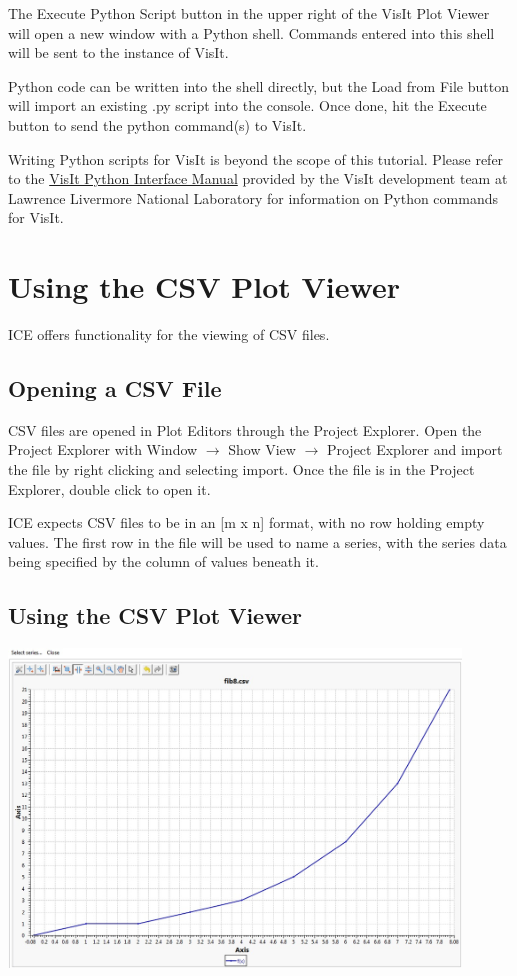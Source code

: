 The Execute Python Script button in the upper right of the VisIt Plot Viewer
will open a new window with a Python shell. Commands entered into this shell
will be sent to the instance of VisIt. 

Python code can be written into the shell directly, but the Load from File
button will import an existing .py script into the console. Once done, hit the
Execute button to send the python command(s) to VisIt.

Writing Python scripts for VisIt is beyond the scope of this tutorial. Please
refer to the
\href{https://wci.llnl.gov/simulation/computer-codes/visit/manuals}{VisIt Python
Interface Manual} provided by the VisIt development team at Lawrence Livermore
National Laboratory for information on Python commands for VisIt.

\section{Using the CSV Plot Viewer}

ICE offers functionality for the viewing of CSV files. 

\subsection{Opening a CSV File}

CSV files are opened in Plot Editors through the Project Explorer. Open the
Project Explorer with Window $\rightarrow$ Show View $\rightarrow$ Project
Explorer and import the file by right clicking and selecting import. Once the
file is in the Project Explorer, double click to open it.

ICE expects CSV files to be in an [m x n] format, with no row holding empty
values. The first row in the file will be used to name a series, with the series
data being specified by the column of values beneath it.

\subsection{Using the CSV Plot Viewer}

\begin{center}
\includegraphics[width=12cm]{images/CSVPlotViewer}
\end{center}

